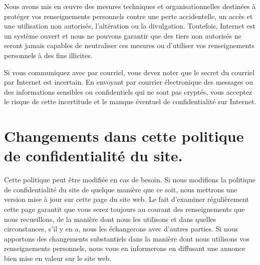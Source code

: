 Nous avons mis en œuvre des mesures techniques et organisationnelles destinées à protéger vos renseignements personnels contre une perte accidentelle, un accès et une utilisation non autorisés, l'altération ou la divulgation. Toutefois, Internet est un système ouvert et nous ne pouvons garantir que des tiers non autorisés ne seront jamais capables de neutraliser ces mesures ou d'utiliser vos renseignements personnels à des fins illicites.

Si vous communiquez avec \eDevoir par courriel, vous devez noter que le secret du courriel par Internet est incertain. En envoyant par courrier électronique des messages ou des informations sensibles ou confidentiels qui ne sont pas cryptés, vous acceptez le risque de cette incertitude et le manque éventuel de confidentialité sur Internet.

\section{Changements dans cette politique de confidentialité du site.}

Cette politique peut être modifiée en cas de besoin. Si nous modifions la politique de confidentialité du site de quelque manière que ce soit, nous mettrons une version mise à jour sur cette page du site web. Le fait d'examiner régulièrement cette page garantit que vous serez toujours au courant des renseignements que nous recueillons, de la manière dont nous les utilisons et dans quelles circonstances, s'il y en a, nous les échangerons avec d'autres parties. Si nous apportons des changements substantiels dans la manière dont nous utilisons vos renseignements personnels, nous vous en informerons en diffusant une annonce bien mise en valeur sur le site web.
